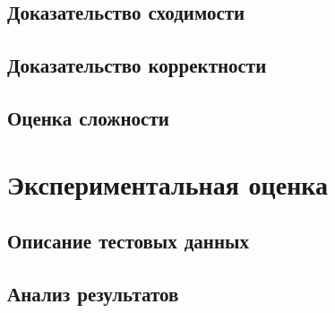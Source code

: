 \subsection{Доказательство сходимости}
\subsection{Доказательство корректности}
\subsection{Оценка сложности}
\section{Экспериментальная оценка}
\subsection{Описание тестовых данных}
\subsection{Анализ результатов}
